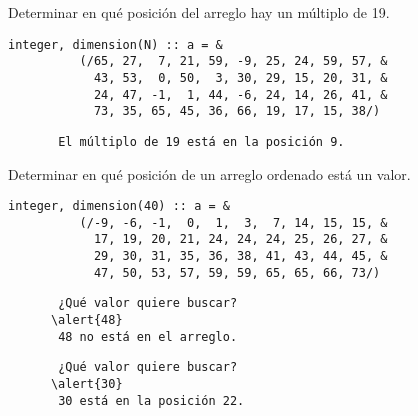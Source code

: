 \documentclass[10pt]{beamer}
\begin{document}
  \begin{frame}[fragile]
    Determinar en qué posición del arreglo
    hay un múltiplo de 19.

    \begin{lstlisting}[gobble=6]
      integer, dimension(N) :: a = &
          (/65, 27,  7, 21, 59, -9, 25, 24, 59, 57, &
            43, 53,  0, 50,  3, 30, 29, 15, 20, 31, &
            24, 47, -1,  1, 44, -6, 24, 14, 26, 41, &
            73, 35, 65, 45, 36, 66, 19, 17, 15, 38/)
    \end{lstlisting}

    \begin{Verbatim}
       El múltiplo de 19 está en la posición 9.
    \end{Verbatim}

\end{frame}

  \begin{frame}[fragile]
    Determinar en qué posición de un arreglo \alert{ordenado}
    está un valor.
    
    \begin{lstlisting}[gobble=6]
      integer, dimension(40) :: a = &
          (/-9, -6, -1,  0,  1,  3,  7, 14, 15, 15, &
            17, 19, 20, 21, 24, 24, 24, 25, 26, 27, &
            29, 30, 31, 35, 36, 38, 41, 43, 44, 45, &
            47, 50, 53, 57, 59, 59, 65, 65, 66, 73/)
    \end{lstlisting}

    \begin{Verbatim}
       ¿Qué valor quiere buscar?
      \alert{48}
       48 no está en el arreglo.
    \end{Verbatim}

    \begin{Verbatim}
       ¿Qué valor quiere buscar?
      \alert{30}
       30 está en la posición 22.
    \end{Verbatim}

\end{frame}
\end{document}
